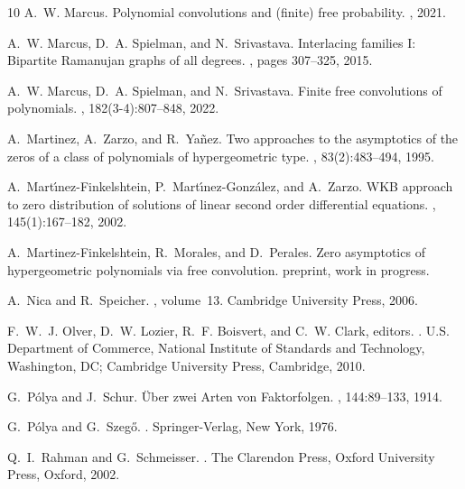 \documentclass[reqno,11pt]{amsart}
\theoremstyle{remark}
\begin{document}
\begin{thebibliography}{10}
	A.~W. Marcus.
	\newblock Polynomial convolutions and (finite) free probability.
	, 2021.
	
	A.~W. Marcus, D.~A. Spielman, and N.~Srivastava.
	\newblock Interlacing families {I}: {B}ipartite {R}amanujan graphs of all degrees.
	, pages 307--325, 2015.
	
	A.~W. Marcus, D.~A. Spielman, and N.~Srivastava.
	\newblock Finite free convolutions of polynomials.
	, 182(3-4):807--848, 2022.
	
	A.~Martinez, A.~Zarzo, and R.~Ya\~nez.
	\newblock Two approaches to the asymptotics of the zeros of a class of polynomials of hypergeometric type.
	, 83(2):483--494, 1995.
	
	A.~Mart\'{\i}nez-Finkelshtein, P.~Mart\'{\i}nez-Gonz\'{a}lez, and A.~Zarzo.
	\newblock W{KB} approach to zero distribution of solutions of linear second order differential equations.
	, 145(1):167--182, 2002.
	
	A.~Martinez-Finkelshtein, R.~Morales, and D.~Perales.
	\newblock Zero asymptotics of hypergeometric polynomials via free convolution.
	\newblock preprint, work in progress.
	
	A.~Nica and R.~Speicher.
	, volume~13.
	\newblock Cambridge University Press, 2006.
	
	F.~W.~J. Olver, D.~W. Lozier, R.~F. Boisvert, and C.~W. Clark, editors.
	.
	\newblock U.S. Department of Commerce, National Institute of Standards and Technology, Washington, DC; Cambridge University Press, Cambridge, 2010.
	
	G.~P\'{o}lya and J.~Schur.
	\newblock \"{U}ber zwei {A}rten von {F}aktorfolgen.
	, 144:89--133, 1914.
	
	G.~P\'{o}lya and G.~Szeg\H{o}.
	.
	\newblock Springer-Verlag, New York, 1976.

	Q.~I.~Rahman and G.~Schmeisser.
	.
	\newblock The Clarendon Press, Oxford University Press, Oxford, 2002.
	

\end{thebibliography}
\end{document}
